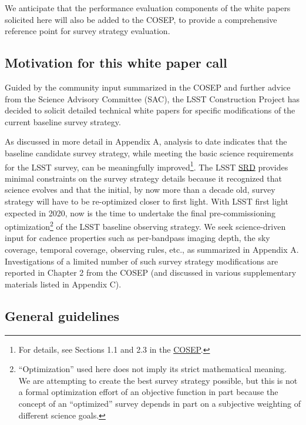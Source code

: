 \documentclass[DM,lsstdraft,toc,usenatbib]{lsstdoc}
\begin{document}
We anticipate that the performance evaluation components of the white papers solicited here will also 
be added to the COSEP, to provide a comprehensive reference point for survey strategy evaluation. 

\subsection{Motivation for this white paper call}

Guided by the community input summarized in the COSEP and further 
advice from the Science Advisory Committee (SAC), the LSST Construction Project has decided to
solicit detailed technical white papers for specific modifications of the current baseline survey strategy.

As discussed in more detail in Appendix A, analysis to date indicates that the baseline candidate
survey strategy, while meeting the basic science requirements for the LSST survey, can be meaningfully 
improved\footnote{For details, see Sections 1.1 
and 2.3 in the \href{http://ls.st/o5k}{COSEP}.}. The LSST \href{http://ls.st/srd}{SRD}
provides minimal constraints on the survey strategy details because it recognized that science evolves and that the 
initial, by now more than a decade old, survey strategy will have to be re-optimized closer to first 
light. With LSST first light expected in 2020, now is the time to undertake the final pre-commissioning
optimization\footnote{``Optimization'' used here does not imply its strict mathematical meaning. 
We are attempting to create the best survey strategy possible, but this is not a formal optimization 
effort of an objective function in part because the concept of an ``optimized'' survey depends in part on a subjective
weighting of different science goals.} 
of the LSST baseline observing strategy. We seek science-driven input for cadence 
properties such as per-bandpass imaging depth, the sky coverage, temporal coverage, observing
rules, etc., as summarized in Appendix A. Investigations of a limited number of such survey strategy 
modifications are reported in Chapter 2 from the COSEP (and discussed 
in various supplementary materials listed in Appendix C). 


\subsection{General guidelines} 
\end{document}
